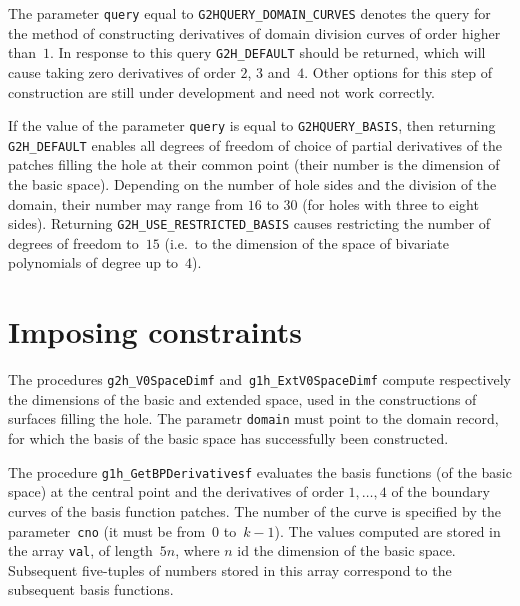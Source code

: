 The parameter \texttt{query} equal to \texttt{G2HQUERY\_DOMAIN\_CURVES} denotes
the query for the method of constructing derivatives of domain division curves
of order higher than~$1$. In response to this query \texttt{G2H\_DEFAULT}
should be returned, which will cause taking zero derivatives of order
$2$, $3$ and~$4$. Other options for this step of construction are still
under development and need not work correctly.

If the value of the parameter \texttt{query} is equal to
\texttt{G2HQUERY\_BASIS}, then returning \texttt{G2H\_DEFAULT} enables all
degrees of freedom of choice of partial derivatives of the patches filling
the hole at their common point (their number is the dimension of the basic
space). Depending on the number of hole sides and the division of the domain,
their number may range from $16$ to $30$ (for holes with three to eight sides).
Returning \texttt{G2H\_USE\_RESTRICTED\_BASIS} causes restricting the number
of degrees of freedom to~$15$ (i.e.\ to the dimension of the space of
bivariate polynomials of degree up to~$4$).


\section{\label{sect:g2h:constraints}Imposing constraints}

\hspace*{\parindent}The procedures \texttt{g2h\_V0SpaceDimf}
and~\texttt{g1h\_ExtV0SpaceDimf}
compute respectively the dimensions of the basic and extended space, used
in the constructions of surfaces filling the hole.
The parametr \texttt{domain} must point to the domain record, for which the
basis of the basic space has successfully been constructed.

\vspace{\bigskipamount}
The procedure \texttt{g1h\_GetBPDerivativesf} evaluates the basis functions
(of the basic space) at the central point and the derivatives of order
$1,\ldots,4$ of the boundary curves of the basis function patches.
The number of the curve is specified by the parameter~\texttt{cno}
(it must be from~$0$ to~$k-1$).
The values computed are stored in the array \texttt{val}, of length~$5n$,
where $n$ id the dimension of the basic space. Subsequent five-tuples of numbers
stored in this array correspond to the subsequent basis functions.

